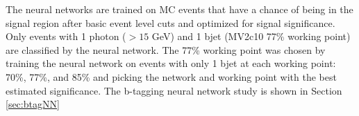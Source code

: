 The neural networks are trained on MC events that have a chance of being in the signal region after basic event level cuts and optimized for signal significance.  Only events with 1 photon ($>15$ GeV) and 1 bjet (MV2c10 77\% working point) are classified by the neural network.  The 77\% working point was chosen by training the neural network on events with only 1 bjet at each working point: 70\%, 77\%, and 85\% and picking the network and working point with the best estimated significance.  The b-tagging neural network study is shown in Section \ref{sec:btagNN}

\begin{figure}[h!]
\centering
{}\hfil
{}
\vspace{-4.5mm}
\hfil

\end{figure}

